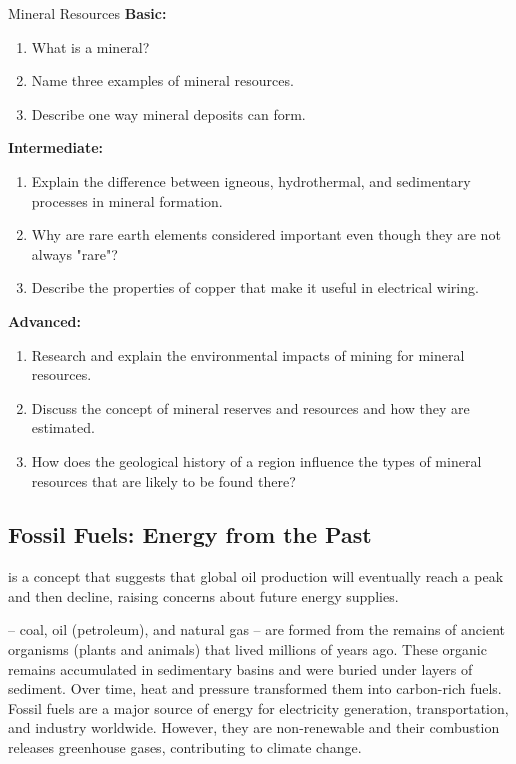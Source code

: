 \begin{tieredquestions}{Mineral Resources}
\textbf{Basic:}
\begin{enumerate}
    \item What is a mineral?
    \item Name three examples of mineral resources.
    \item Describe one way mineral deposits can form.
\end{enumerate}
\textbf{Intermediate:}
\begin{enumerate}
    \item Explain the difference between igneous, hydrothermal, and sedimentary processes in mineral formation.
    \item Why are rare earth elements considered important even though they are not always "rare"?
    \item Describe the properties of copper that make it useful in electrical wiring.
\end{enumerate}
\textbf{Advanced:}
\begin{enumerate}
    \item Research and explain the environmental impacts of mining for mineral resources.
    \item Discuss the concept of mineral reserves and resources and how they are estimated.
    \item  How does the geological history of a region influence the types of mineral resources that are likely to be found there?
\end{enumerate}
\end{tieredquestions}

\subsection{Fossil Fuels: Energy from the Past}

\begin{marginnote}
 is a concept that suggests that global oil production will eventually reach a peak and then decline, raising concerns about future energy supplies.
\end{marginnote}

 – coal, oil (petroleum), and natural gas – are formed from the remains of ancient organisms (plants and animals) that lived millions of years ago.  These organic remains accumulated in sedimentary basins and were buried under layers of sediment. Over time, heat and pressure transformed them into carbon-rich fuels. Fossil fuels are a major source of energy for electricity generation, transportation, and industry worldwide. However, they are non-renewable and their combustion releases greenhouse gases, contributing to climate change.

